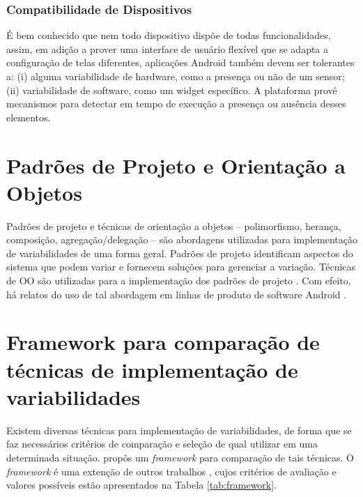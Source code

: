 \subsubsection{Compatibilidade de Dispositivos}

É bem conhecido que nem todo dispositivo dispõe de todas funcionalidades, assim,
em adição a prover uma interface de usuário flexível que se adapta a configuração
de telas diferentes, aplicações Android também devem ser tolerantes a: (i) alguma
variabilidade de hardware, como a presença ou não de um sensor; (ii) variabilidade
de software, como um widget específico. A plataforma provê mecanismos para detectar
em tempo de execução a presença ou ausência desses elementos.

\section{Padrões de Projeto e Orientação a Objetos}
Padrões de projeto \cite{Gamma1994} e técnicas de orientação a objetos – polimorfismo,
herança, composição, agregação/delegação – são abordagens utilizadas para implementação
de variabilidades de uma forma geral. Padrões de projeto identificam aspectos do sistema
que podem variar e fornecem soluções para gerenciar a variação. Técnicas de OO
são utilizadas para a implementação dos padrões de projeto \cite{Gacek2001}.
Com efeito, há relatos do uso de tal abordagem em linhas de produto de software Android \cite{Pavlic2013}.

\section{Framework para comparação de técnicas de implementação de variabilidades}
\label{sec:framework}
Existem diversas técnicas para implementação de variabilidades, de forma que se
faz necessários critérios de comparação e seleção de qual utilizar em uma determinada
situação.  propôs um \textit{framework} para comparação de tais técnicas.
O \textit{framework} é uma extenção de outros trabalhos \cite{Gacek2001} \cite{Coplien1999},
cujos critérios de avaliação e valores possíveis estão apresentados na Tabela \ref{tab:framework}.


